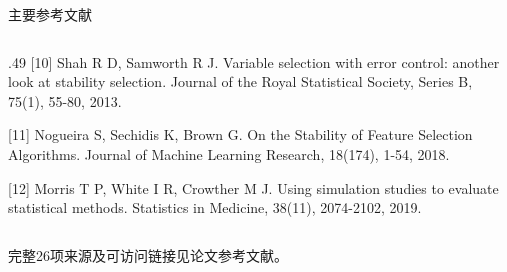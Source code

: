 \documentclass[aspectratio=169]{beamer}
\begin{document}
\begin{frame}{主要参考文献}
\begin{columns}[T]
\begin{column}{.49\textwidth}
[10] Shah R D, Samworth R J. Variable selection with error control: another look at stability selection. Journal of the Royal Statistical Society, Series B, 75(1), 55-80, 2013.\par\vspace{0.4em}
[11] Nogueira S, Sechidis K, Brown G. On the Stability of Feature Selection Algorithms. Journal of Machine Learning Research, 18(174), 1-54, 2018.\par\vspace{0.4em}
[12] Morris T P, White I R, Crowther M J. Using simulation studies to evaluate statistical methods. Statistics in Medicine, 38(11), 2074-2102, 2019.\par\vspace{0.4em}
\end{column}\end{columns}\vfill{\scriptsize 完整26项来源及可访问链接见论文参考文献。}
\end{frame}
\end{document}
